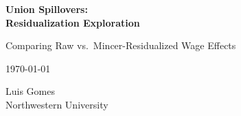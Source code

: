 \documentclass[12pt,letterpaper]{article}
\begin{document}
\begin{titlepage}
\centering
\vspace*{2cm}
{\Huge\bfseries Union Spillovers:\\Residualization Exploration\par}
\vspace{2cm}
{\Large Comparing Raw vs.\ Mincer-Residualized Wage Effects\par}
\vspace{1cm}
{\large \today\par}
\vfill
{\large Luis Gomes\\Northwestern University\par}
\end{titlepage}
\end{document}
